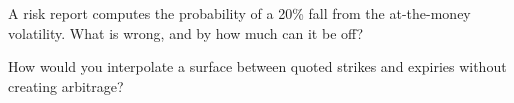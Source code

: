 \begin{interviewq}\label{iq:dv:implied-volatility-and-its-surface:5}
A risk report computes the probability of a 20\% fall from the at-the-money volatility. What
is wrong, and by how much can it be off?
\end{interviewq}

\begin{interviewq}\label{iq:dv:implied-volatility-and-its-surface:6}
How would you interpolate a surface between quoted strikes and expiries without creating
arbitrage?
\end{interviewq}
